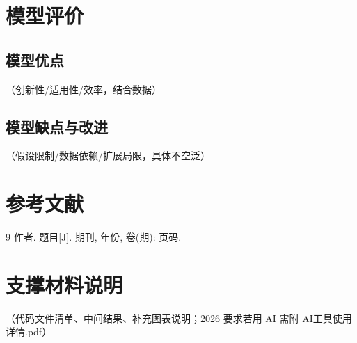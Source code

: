 \documentclass{cumcmthesis}
\begin{document}
\section{模型评价}
\subsection{模型优点}
（创新性/适用性/效率，结合数据）
\subsection{模型缺点与改进}
（假设限制/数据依赖/扩展局限，具体不空泛）

\section{参考文献}
\begin{thebibliography}{9}
 作者. 题目[J]. 期刊, 年份, 卷(期): 页码.
\end{thebibliography}

\appendix
\section{支撑材料说明}
（代码文件清单、中间结果、补充图表说明；2026 要求若用 AI 需附 AI工具使用详情.pdf）
\end{document}
